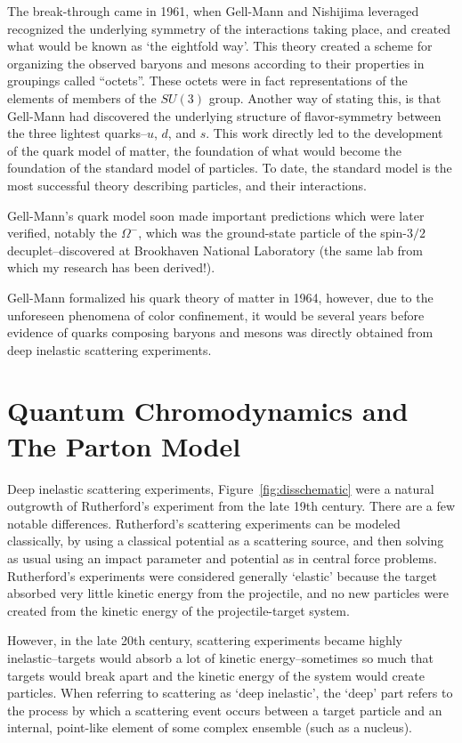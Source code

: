 The break-through came in 1961, when Gell-Mann and Nishijima leveraged
recognized the underlying symmetry of the interactions taking place, and created
what would be known as `the eightfold way'. This theory created a scheme for
organizing the observed baryons and mesons according to their properties in
groupings called ``octets''. These octets were in fact representations of the
elements of members of the $SU(3)$ group. Another way of stating this, is that
Gell-Mann had discovered the underlying structure of flavor-symmetry between the
three lightest quarks--$u$, $d$, and $s$. This work directly led to the
development of the quark model of matter, the foundation of what would become
the foundation of the standard model of particles. To date, the standard model
is the most successful theory describing particles, and their interactions.

Gell-Mann's quark model soon made important predictions which were later
verified, notably the $\Omega^{-}$, which was the ground-state particle of the
spin-$3/2$ decuplet--discovered at Brookhaven National Laboratory (the same lab
from which my research has been derived!). 

Gell-Mann formalized his quark theory of matter in 1964, however, due to the
unforeseen phenomena of color confinement, it would be several years before
evidence of quarks composing baryons and mesons was directly obtained from deep
inelastic scattering experiments.

\clearpage
\section{Quantum Chromodynamics and The Parton Model}

Deep inelastic scattering experiments, Figure~\ref{fig:disschematic} were a
natural outgrowth of Rutherford's experiment from the late 19th century. There
are a few notable differences.  Rutherford's scattering experiments can be
modeled classically, by using a classical potential as a scattering source, and
then solving as usual using an impact parameter and potential as in central
force problems. Rutherford's experiments were considered generally `elastic'
because the target absorbed very little kinetic energy from the projectile, and
no new particles were created from the kinetic energy of the projectile-target
system.

However, in the late 20th century, scattering experiments became highly
inelastic--targets would absorb a lot of kinetic energy--sometimes so much
that targets would break apart and the kinetic energy of the system would create
particles. When referring to scattering as `deep inelastic', the `deep' part
refers to the process by which a scattering event occurs between a target
particle and an internal, point-like element of some complex ensemble (such as a
nucleus).

